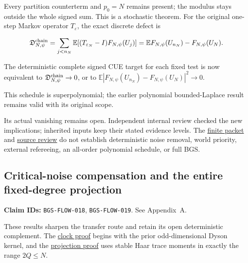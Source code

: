 \begin{theorem}
Every partition counterterm and \(p_0=N\) remains present; the modulus
stays outside the whole signed sum. This is a stochastic theorem.
For the original one-step Markov operator \(T_\varepsilon\), the exact
discrete defect is

\[
\mathfrak D^{\rm chain}_{N,\psi}
=\sum_{j<n_N}\mathbb E[(T_{\varepsilon_N}-I)F_{N,\psi}(U_j)]
=\mathbb EF_{N,\psi}(U_{n_N})-F_{N,\psi}(U_N).
\]

The deterministic complete signed CUE target for each fixed test is now
equivalent to \(\mathfrak D^{\rm chain}_{N,\psi}\to0\), or to
\(\mathbb E|F_{N,\psi}(U_{n_N})-F_{N,\psi}(U_N)|^2\to0\).

\end{theorem}

This schedule is superpolynomial; the earlier polynomial bounded-Laplace
result remains valid with its original scope.

Its actual vanishing remains open. Independent internal review checked the
new implications; inherited inputs keep their stated evidence levels.
The \href{https://github.com/ChurilovMaksim/BGS/blob/main/archive/evidence/executions/20261005/all-order/manifest.json}{finite packet}
and \href{https://github.com/ChurilovMaksim/BGS/blob/main/literature/all_order_sources_20261005.md}{source review} do not
establish deterministic noise removal, world priority, external refereeing,
an all-order polynomial schedule, or full BGS.

\hypertarget{critical-noise-compensation-and-the-entire-fixed-degree-projection}{%
\subsection{Critical-noise compensation and the entire fixed-degree projection}\label{critical-noise-compensation-and-the-entire-fixed-degree-projection}}

\textbf{Claim IDs:} \texttt{BGS-FLOW-018}, \texttt{BGS-FLOW-019}. See Appendix~A.

These results sharpen the
transfer route and retain its open deterministic complement. The
\href{https://github.com/ChurilovMaksim/BGS/blob/main/mathematics/clock_structure_and_noise_scale.md}{clock proof} begins with the prior
odd-dimensional Dyson kernel, and the
\href{https://github.com/ChurilovMaksim/BGS/blob/main/mathematics/fixed_degree_heat_projection.md}{projection proof} uses stable Haar trace
moments in exactly the range \(2Q\le N\).

